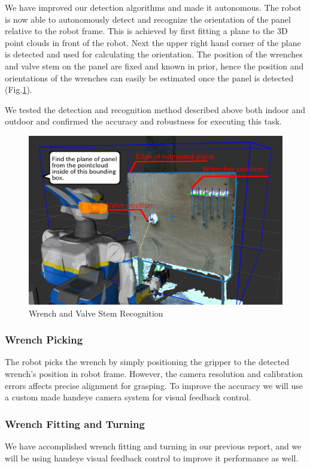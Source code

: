 
We have improved our detection algorithms and made it autonomous. The
robot is now able to autonomously detect and recognize the orientation
of the panel relative to the robot frame.
This is achieved by
first fitting a plane to the 3D point clouds in front of the
robot. Next the upper right hand corner of the plane is detected and
used for calculating the orientation. The position of the wrenches and valve
stem on the panel are fixed and known in prior, hence the position and
orientations of the wrenches can easily be estimated
once the panel is detected (Fig.\ref{fig: task2_object-recognition}).

We tested the detection and recognition method described above both
indoor and outdoor and confirmed the accuracy and robustness for executing this task.


\begin{figure}[htb]
  \begin{center}
    \includegraphics[width=0.80\columnwidth]{sections/task2/images/wrench_valve_recog.png}
    \caption{Wrench and Valve Stem Recognition}
    \label{fig: task2_object-recognition}
  \end{center}
\end{figure}

\subsubsection{Wrench Picking}
The robot picks the wrench by 
simply positioning the gripper to
the detected wrench's position in robot frame. However, the camera
resolution and calibration errors affects precise alignment for grasping.
To improve the accuracy we will use a custom made handeye camera system for visual
feedback control.

\subsubsection{Wrench Fitting and Turning}
We have accomplished wrench fitting and turning in our previous
report, and we will be using handeye visual feedback control to
improve it performance as well.

